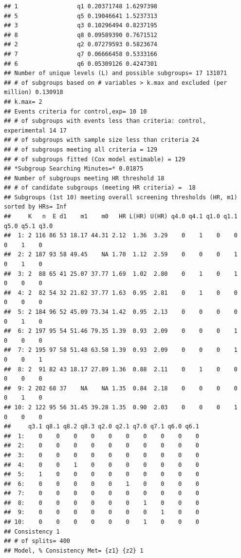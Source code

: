 \documentclass[smallextended]{svjour3}
\makeatletter
\newenvironment{kframe}{%
 \def\at@end@of@kframe{}%
 \ifinner\ifhmode%
  \def\at@end@of@kframe{\end{minipage}}%
  \begin{minipage}{\columnwidth}%
 \fi\fi%
 \def\FrameCommand##1{\hskip\@totalleftmargin \hskip-\fboxsep
 \colorbox{shadecolor}{##1}\hskip-\fboxsep
     \hskip-\linewidth \hskip-\@totalleftmargin \hskip\columnwidth}%
 \MakeFramed {\advance\hsize-\width
   \@totalleftmargin\z@ \linewidth\hsize
   \@setminipage}}%
 {\par\unskip\endMakeFramed%
 \at@end@of@kframe}
\newenvironment{knitrout}{}{} %
\makeatother
\begin{document}
\begin{knitrout}
\begin{kframe}
\begin{verbatim}
## 1                 q1 0.20371748 1.6297398
## 5                 q5 0.19046641 1.5237313
## 3                 q3 0.10296494 0.8237195
## 8                 q8 0.09589390 0.7671512
## 2                 q2 0.07279593 0.5823674
## 7                 q7 0.06666458 0.5333166
## 6                 q6 0.05309126 0.4247301
## Number of unique levels (L) and possible subgroups= 17 131071 
## # of subgroups based on # variables > k.max and excluded (per million) 0.130918 
## k.max= 2 
## Events criteria for control,exp= 10 10 
## # of subgroups with events less than criteria: control, experimental 14 17 
## # of subgroups with sample size less than criteria 24 
## # of subgroups meeting all criteria = 129 
## # of subgroups fitted (Cox model estimable) = 129 
## *Subgroup Searching Minutes=* 0.01875 
## Number of subgroups meeting HR threshold 18 
## # of candidate subgroups (meeting HR criteria) =  18 
## Subgroups (1st 10) meeting overall screening thresholds (HR, m1) sorted by HRs= Inf 
##     K   n  E d1    m1    m0   HR L(HR) U(HR) q4.0 q4.1 q1.0 q1.1 q5.0 q5.1 q3.0
##  1: 2 116 86 53 18.17 44.31 2.12  1.36  3.29    0    1    0    0    0    1    0
##  2: 2 187 93 58 49.45    NA 1.70  1.12  2.59    0    0    0    1    0    1    0
##  3: 2  88 65 41 25.07 37.77 1.69  1.02  2.80    0    1    0    1    0    0    0
##  4: 2  82 54 32 21.82 37.77 1.63  0.95  2.81    0    1    0    0    0    0    0
##  5: 2 184 96 52 45.09 73.34 1.42  0.95  2.13    0    0    0    0    0    1    0
##  6: 2 197 95 54 51.46 79.35 1.39  0.93  2.09    0    0    0    1    0    0    0
##  7: 2 195 97 58 51.48 63.58 1.39  0.93  2.09    0    0    0    1    0    0    1
##  8: 2  91 82 43 18.17 27.89 1.36  0.88  2.11    0    1    0    0    0    0    0
##  9: 2 202 68 37    NA    NA 1.35  0.84  2.18    0    0    0    0    0    1    0
## 10: 2 122 95 56 31.45 39.28 1.35  0.90  2.03    0    0    0    1    0    0    0
##     q3.1 q8.1 q8.2 q8.3 q2.0 q2.1 q7.0 q7.1 q6.0 q6.1
##  1:    0    0    0    0    0    0    0    0    0    0
##  2:    0    0    0    0    0    0    0    0    0    0
##  3:    0    0    0    0    0    0    0    0    0    0
##  4:    0    0    1    0    0    0    0    0    0    0
##  5:    1    0    0    0    0    0    0    0    0    0
##  6:    0    0    0    0    0    1    0    0    0    0
##  7:    0    0    0    0    0    0    0    0    0    0
##  8:    0    0    0    0    0    0    1    0    0    0
##  9:    0    0    0    0    0    0    0    1    0    0
## 10:    0    0    0    0    0    0    1    0    0    0
## Consistency 1 
## # of splits= 400 
## Model, % Consistency Met= {z1} {z2} 1 

\end{verbatim}
\end{kframe}
\end{knitrout}
\end{document}
